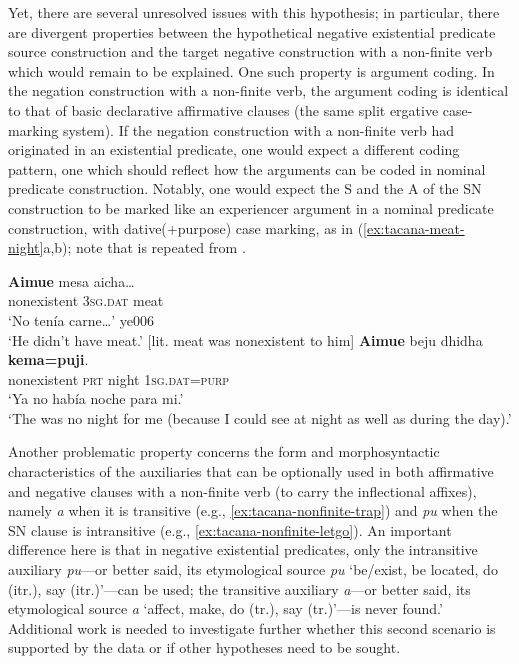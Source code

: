 \documentclass[output=paper,draft,draftmode,colorlinks,citecolor=brown]{langscibook}
\begin{document}
Yet, there are several unresolved issues with this hypothesis; in
particular, there are divergent properties between the hypothetical
negative existential predicate source construction and the target negative
construction with a non-finite verb which would remain to be explained.
One such property is argument coding.  In the negation construction with a
non-finite verb, the argument coding is identical to that of basic
declarative affirmative clauses (the same split ergative case-marking
system). If the negation construction with a
non-finite verb had originated in an existential predicate, one would
expect a different coding pattern, one which should reflect how the
arguments can be coded in nominal predicate construction. Notably, one
would expect the S and the A of the SN construction to be marked like an
experiencer argument in a nominal predicate construction, with
dative(+purpose) case marking, as in (\ref{ex:tacana-meat-night}a,b);
note that  is repeated from .
%
\begin{exe}\ex\label{ex:tacana-meat-night}
\begin{xlist}
\ex\label{ex:tacana-still-no-meat}
\gll {}\textbf{Aimue} mesa aicha…\\
    nonexistent  \textsc{3sg.dat}  meat\\
\glt `No tenía carne…' ye006\\
`He didn't have meat.' [lit. meat was nonexistent to him]
\ex\label{ex:tacana-no-night}
\gll  \textbf{Aimue}  beju  dhidha  \textbf{kema=puji}.\\
    nonexistent  \textsc{prt}  night  1\textsc{sg.dat=purp}\\
\glt `Ya no había noche para mi.'\\
`The was no night for me (because I could see at night as well as during the day).'
\end{xlist}\end{exe}

Another problematic property concerns the form and morphosyntactic
characteristics of the auxiliaries that can be optionally used in both
affirmative and negative clauses with a non-finite verb (to carry the
inflectional affixes), namely \textit{a} when it is transitive (e.g.,
\ref{ex:tacana-nonfinite-trap}) and \textit{pu} when the SN clause is
intransitive (e.g., \ref{ex:tacana-nonfinite-letgo}). An important difference here is that in negative existential predicates, only the intransitive auxiliary \textit{pu}—or better said, its etymological source \textit{pu} ‘be/exist, be located, do (itr.), say (itr.)’—can be used; the transitive auxiliary \textit{a}—or better said, its etymological source \textit{a} ‘affect, make, do (tr.), say (tr.)’—is never found.' Additional work is needed to investigate further whether this second scenario is supported by the data or if other hypotheses need to be sought.
\end{document}
